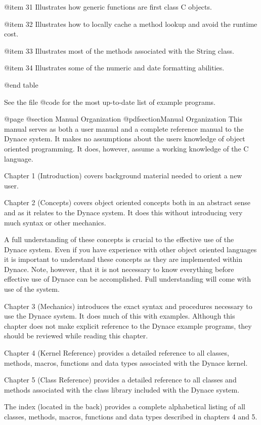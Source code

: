 @item 31
Illustrates how generic functions are first class C objects.

@item 32
Illustrates how to locally cache a method lookup and avoid the
runtime cost.

@item 33
Illustrates most of the methods associated with the String class.

@item 34
Illustrates some of the numeric and date formatting abilities.

@end table


See the file @code{\DYNACE\EXAMPLES\LIST} for the most up-to-date list
of example programs.


@page
@section Manual Organization
@pdfsection{Manual Organization}
This manual serves as both a user manual and a complete reference manual
to the Dynace system.  It makes no assumptions about the users knowledge
of object oriented programming.  It does, however, assume a working
knowledge of the C language.

Chapter 1 (Introduction) covers background material needed to orient
a new user.

Chapter 2 (Concepts) covers object oriented concepts both in an abstract
sense and as it relates to the Dynace system.  It does this without
introducing very much syntax or other mechanics.

A full understanding of these concepts is crucial to the effective use
of the Dynace system.  Even if you have experience with other object
oriented languages it is important to understand these concepts as they
are implemented within Dynace.  Note, however, that it is not necessary to
know everything before effective use of Dynace can be accomplished.  Full
understanding will come with use of the system.

Chapter 3 (Mechanics) introduces the exact syntax and procedures
necessary to use the Dynace system.  It does much of this with examples.
Although this chapter does not make explicit reference to the Dynace example
programs, they should be reviewed while reading this chapter.

Chapter 4 (Kernel Reference) provides a detailed reference to all
classes, methods, macros, functions and data types associated with
the Dynace kernel.

Chapter 5 (Class Reference)  provides a detailed reference to all
classes and methods associated with the class library included
with the Dynace system.

The index (located in the back) provides a complete alphabetical
listing of all classes, methods, macros, functions and data types
described in chapters 4 and 5.






